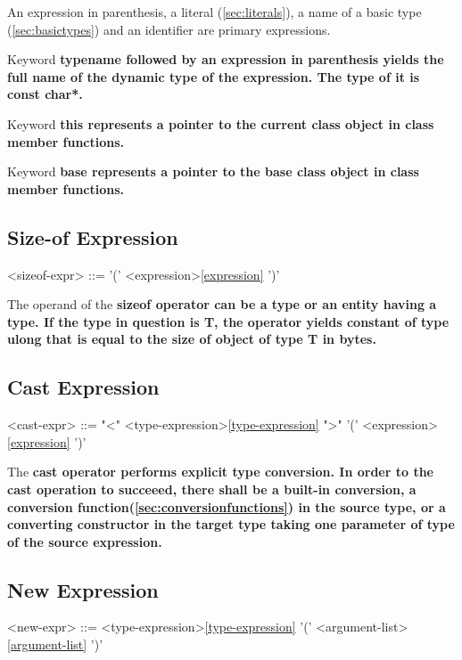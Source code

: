 \documentclass[a4paper,oneside,11pt]{article}
\begin{document}
An expression in parenthesis, a literal (\ref{sec:literals}), a name of a basic type (\ref{sec:basictypes}) and an identifier are primary expressions.

Keyword \bf{typename} followed by an expression in parenthesis yields the full name of the dynamic type of the expression.
The type of it is \bf{const char*}.

Keyword \bf{this} represents a pointer to the current class object in class member functions.

Keyword \bf{base} represents a pointer to the base class object in class member functions.

\subsection{Size-of Expression}

\begin{grammar}
\label{sizeof-expr}<sizeof-expr> ::=  '(' <expression>\ref{expression} ')'
\end{grammar}

The operand of the \bf{sizeof} operator can be a type or an entity having a type.
If the type in question is T, the operator yields constant of type \bf{ulong} that is equal to the size of object of type T in bytes.

\subsection{Cast Expression}\label{sec:castexpression}

\begin{grammar}
\label{cast-expr}<cast-expr> ::=  "<" <type-expression>\ref{type-expression} ">" '(' <expression>\ref{expression} ')'
\end{grammar}

The \bf{cast} operator performs explicit type conversion.
In order to the cast operation to succeeed, there shall be a built-in conversion, a conversion function(\ref{sec:conversionfunctions}) in the source type,
or a converting constructor in the target type taking one parameter of type of the source expression.

\subsection{New Expression}

\begin{grammar}
\label{new-expr}<new-expr> ::=  <type-expression>\ref{type-expression} '(' <argument-list>\ref{argument-list} ')'
\end{grammar}
\end{document}
